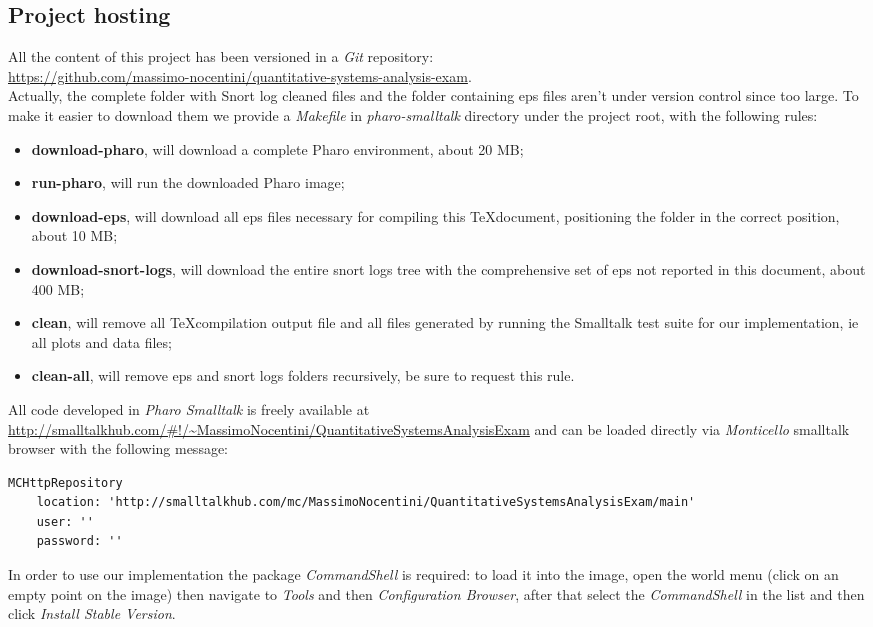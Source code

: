 \documentclass[10pt,a4paper]{article}
\begin{document}
    \subsection{Project hosting}
    All the content of this project has been versioned in a \emph{Git} repository:\\
    \url{https://github.com/massimo-nocentini/quantitative-systems-analysis-exam}.\\

    Actually, the complete folder with Snort log cleaned files and the
    folder containing eps files aren't under version control since too
    large. To make it easier to download them we provide a
    \emph{Makefile} in \emph{pharo-smalltalk} directory under the
    project root, with the following rules:
    \begin{itemize}
    \item \textbf{download-pharo}, will download a complete Pharo environment, about 20 MB;
    \item \textbf{run-pharo}, will run the downloaded Pharo image;
    \item \textbf{download-eps}, will download all eps files necessary
      for compiling this \TeX document, positioning the folder in the
      correct position, about 10 MB;
    \item \textbf{download-snort-logs}, will download the entire snort
      logs tree with the comprehensive set of eps not reported in this
      document, about 400 MB;
    \item \textbf{clean}, will remove all \TeX compilation output file
      and all files generated by running the Smalltalk test suite for
      our implementation, ie all plots and data files;
    \item \textbf{clean-all}, will remove eps and snort logs folders
      recursively, be sure to request this rule.
    \end{itemize}

    \newpage

    All code developed in \emph{Pharo Smalltalk} is freely available
    at
    \url{http://smalltalkhub.com/#!/~MassimoNocentini/QuantitativeSystemsAnalysisExam}
    and can be loaded directly via \emph{Monticello} smalltalk browser
    with the following message:
    \begin{adjustwidth}{-2cm}{}
\begin{verbatim}
MCHttpRepository
	location: 'http://smalltalkhub.com/mc/MassimoNocentini/QuantitativeSystemsAnalysisExam/main'
	user: ''
	password: ''
\end{verbatim}
    \end{adjustwidth}    
    In order to use our implementation the package \emph{CommandShell}
    is required: to load it into the image, open the world menu (click
    on an empty point on the image) then navigate to \emph{Tools} and
    then \emph{Configuration Browser}, after that select the
    \emph{CommandShell} in the list and then click \emph{Install
      Stable Version}.
      
\end{document}
